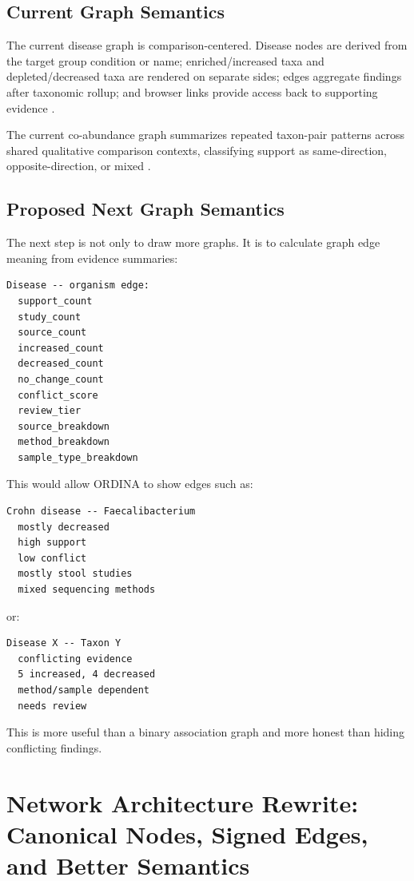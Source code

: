 \documentclass[11pt,a4paper]{article}
\begin{document}
\subsection{Current Graph Semantics}

The current disease graph is comparison-centered. Disease nodes are derived from the target group condition or name; enriched/increased taxa and depleted/decreased taxa are rendered on separate sides; edges aggregate findings after taxonomic rollup; and browser links provide access back to supporting evidence \cite{ordina-disease-graph}.

The current co-abundance graph summarizes repeated taxon-pair patterns across shared qualitative comparison contexts, classifying support as same-direction, opposite-direction, or mixed \cite{ordina-coabundance-graph}.

\subsection{Proposed Next Graph Semantics}

The next step is not only to draw more graphs. It is to calculate graph edge meaning from evidence summaries:

\begin{verbatim}
Disease -- organism edge:
  support_count
  study_count
  source_count
  increased_count
  decreased_count
  no_change_count
  conflict_score
  review_tier
  source_breakdown
  method_breakdown
  sample_type_breakdown
\end{verbatim}

This would allow ORDINA to show edges such as:

\begin{verbatim}
Crohn disease -- Faecalibacterium
  mostly decreased
  high support
  low conflict
  mostly stool studies
  mixed sequencing methods
\end{verbatim}

or:

\begin{verbatim}
Disease X -- Taxon Y
  conflicting evidence
  5 increased, 4 decreased
  method/sample dependent
  needs review
\end{verbatim}

This is more useful than a binary association graph and more honest than hiding conflicting findings.


\section{Network Architecture Rewrite: Canonical Nodes, Signed Edges, and Better Semantics}
\end{document}
